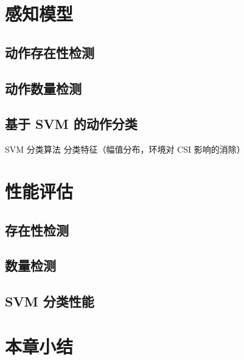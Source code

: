 \section{感知模型}

\subsection{动作存在性检测}
\subsection{动作数量检测}
\subsection{基于 SVM 的动作分类}
            
SVM 分类算法
分类特征（幅值分布，环境对 CSI 影响的消除）     




\section{性能评估}

\subsection{存在性检测}
\subsection{数量检测}
\subsection{SVM 分类性能}




\section{本章小结}




